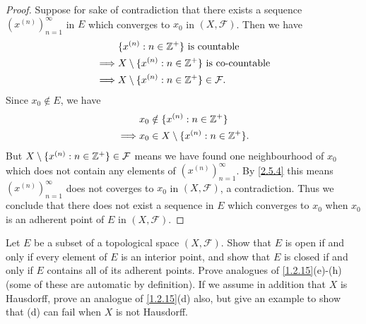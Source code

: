\begin{proof}
  Suppose for sake of contradiction that there exists a sequence \((x^{(n)})_{n = 1}^\infty\) in \(E\) which converges to \(x_0\) in \((X, \mathcal{F})\).
  Then we have
  \begin{align*}
             & \{x^{(n)} : n \in \mathbb{Z}^+\} \text{ is countable}                \\
    \implies & X \setminus \{x^{(n)} : n \in \mathbb{Z}^+\} \text{ is co-countable} \\
    \implies & X \setminus \{x^{(n)} : n \in \mathbb{Z}^+\} \in \mathcal{F}.
  \end{align*}
  Since \(x_0 \notin E\), we have
  \begin{align*}
             & x_0 \notin \{x^{(n)} : n \in \mathbb{Z}^+\}           \\
    \implies & x_0 \in X \setminus \{x^{(n)} : n \in \mathbb{Z}^+\}.
  \end{align*}
  But \(X \setminus \{x^{(n)} : n \in \mathbb{Z}^+\} \in \mathcal{F}\) means we have found one neighbourhood of \(x_0\) which does not contain any elements of \((x^{(n)})_{n = 1}^\infty\).
  By \cref{2.5.4} this means \((x^{(n)})_{n = 1}^\infty\) does not coverges to \(x_0\) in \((X, \mathcal{F})\), a contradiction.
  Thus we conclude that there does not exist a sequence in \(E\) which converges to \(x_0\) when \(x_0\) is an adherent point of \(E\) in \((X, \mathcal{F})\).
\end{proof}

\begin{ex}\label{ex:2.5.11}
  Let \(E\) be a subset of a topological space \((X, \mathcal{F})\).
  Show that \(E\) is open if and only if every element of \(E\) is an interior point, and show that \(E\) is closed if and only if \(E\) contains all of its adherent points.
  Prove analogues of \cref{1.2.15}(e)-(h) (some of these are automatic by definition).
  If we assume in addition that \(X\) is Hausdorff, prove an analogue of \cref{1.2.15}(d) also, but give an example to show that (d) can fail when \(X\) is not Hausdorff.
\end{ex}

